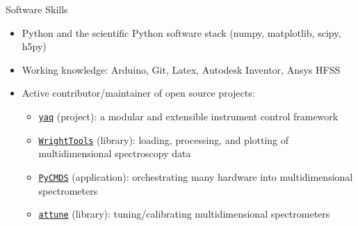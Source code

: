 \documentclass{resume} %
\begin{document}
\begin{rSection}{Software Skills}
	\begin{itemize}[leftmargin = 0 pt]
		\item Python and the scientific Python software stack (numpy, matplotlib, scipy, h5py)
		\item Working knowledge: Arduino, Git, Latex, Autodesk Inventor, Ansys HFSS
		\item Active contributor/maintainer of open source projects:
		\begin{itemize}
			\item \href{http://yaq.fyi}{\texttt{yaq}} (project): a modular and extensible instrument control framework
			\item \href{http://wright.tools}{\texttt{WrightTools}} (library): loading, processing, and plotting of multidimensional spectroscopy data 
			\item \href{http://github.com/wright-group/PyCMDS}{\texttt{PyCMDS}} (application): orchestrating many hardware into multidimensional spectrometers  
			\item \href{http://github.com/wright-group/attune}{\texttt{attune}} (library): tuning/calibrating multidimensional spectrometers
		\end{itemize}
		
	\end{itemize}	
\end{rSection}
\end{document}
